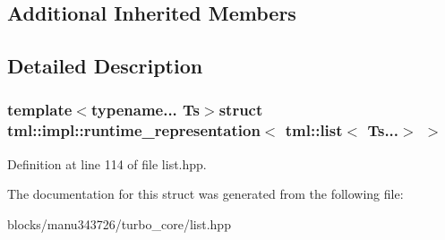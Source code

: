 \subsection*{Additional Inherited Members}


\subsection{Detailed Description}
\subsubsection*{template$<$typename... Ts$>$struct tml\+::impl\+::runtime\+\_\+representation$<$ tml\+::list$<$ Ts...$>$ $>$}



Definition at line 114 of file list.\+hpp.



The documentation for this struct was generated from the following file\+:\begin{DoxyCompactItemize}
\item 
blocks/manu343726/turbo\+\_\+core/list.\+hpp\end{DoxyCompactItemize}
